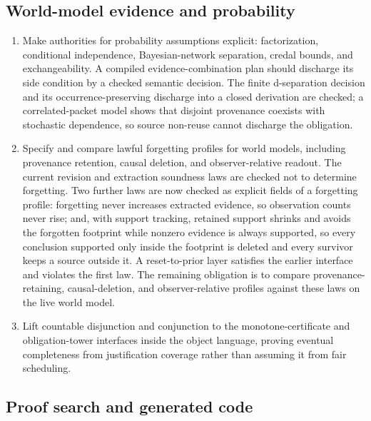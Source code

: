 \documentclass[11pt]{article}
\theoremstyle{definition}
\theoremstyle{remark}
\begin{document}
\subsection{World-model evidence and probability}

\begin{enumerate}
\item Make authorities for probability assumptions explicit: factorization,
  conditional independence, Bayesian-network separation, credal bounds, and
  exchangeability. A compiled evidence-combination plan should discharge
  its side condition by a checked semantic decision.  The finite
  d-separation decision and its occurrence-preserving discharge into a closed
  derivation are checked; a correlated-packet model shows that disjoint
  provenance coexists with stochastic dependence, so source non-reuse cannot
  discharge the obligation.
\item Specify and compare lawful forgetting profiles for world models,
  including provenance retention, causal deletion, and observer-relative
  readout.  The current revision and extraction soundness laws are checked not
  to determine forgetting.  Two further laws are now checked as explicit
  fields of a forgetting profile: forgetting never increases extracted
  evidence, so observation counts never rise; and, with support tracking,
  retained support shrinks and avoids the forgotten footprint while nonzero
  evidence is always supported, so every conclusion supported only inside the
  footprint is deleted and every survivor keeps a source outside it.  A
  reset-to-prior layer satisfies the earlier interface and violates the first
  law.  The remaining obligation is to compare provenance-retaining,
  causal-deletion, and observer-relative profiles against these laws on the
  live world model.
\item Lift countable disjunction and conjunction to the monotone-certificate
  and obligation-tower interfaces inside the object language, proving eventual
  completeness from justification coverage rather than assuming it from fair
  scheduling.
\end{enumerate}

\subsection{Proof search and generated code}
\end{document}
